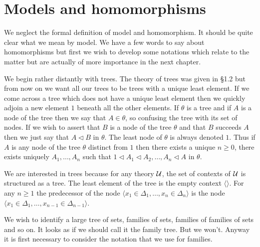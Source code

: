 \section{Models and homomorphisms} \label{sec:source-1-9}

We neglect the formal definition of model and homomorphism.
%
 It should be quite clear what we mean by model.
%
 We have a few words to say about homomorphisms but first we wish to develop some notations which relate to the matter but are actually of more importance in the next chapter.

We begin rather distantly with trees.
%
 The theory of trees was given in \S 1.2 but from now on we want all our trees to be trees with a unique least element.
%
 If we come across a tree which does not have a unique least element then we quickly adjoin a new element $1$  beneath all the other elements.
%
 If $\theta$ is a tree and if $A$ is a node of the tree then we say that $A\in\theta$, so confusing the tree with its set of nodes.
%
 If we wish to assert that $B$ is a node of the tree $\theta$ and that $B$ succeeds $A$ then we just say that $A\triangleleft B$ in $\theta$.
%
 The least node of $\theta$ is always denoted $1$.
%
 Thus if $A$ is any node of the tree $\theta$ distinct from $1$ then there exists a unique $n\geq 0$, there exists uniquely $A_1,\ldots,A_n$ such that $1\triangleleft A_1\triangleleft A_2,\ldots,A_n\triangleleft A$ in $\theta$.

We are interested in trees because for any theory $\mathcal{U}$, the set of contexts of $\mathcal{U}$ is structured as a tree.
%
 The least element of the tree is the empty context $\langle\rangle$.
%
 For any $n\geq 1$ the predecessor of the node $\langle x_1\in\Delta_1,\ldots,x_n\in\Delta_n\rangle$ is the node $\langle x_1\in\Delta_1,\ldots,x_{n-1}\in\Delta_{n-1}\rangle$.

We wish to identify a large tree of sets, families of sets, families of families of sets and so on.
%
 It looks as if we should call it the family tree.
%
 But we won't.
%
 Anyway it is first necessary to consider the notation that we use for families.

